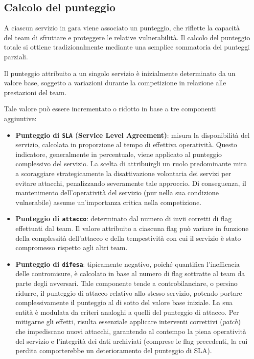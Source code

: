 \subsection{Calcolo del punteggio}

A ciascun servizio in gara viene associato un punteggio, che riflette la capacità del team di sfruttare e proteggere le relative vulnerabilità. Il calcolo del punteggio totale si ottiene tradizionalmente mediante una semplice sommatoria dei punteggi parziali.

Il punteggio attribuito a un singolo servizio è inizialmente determinato da un valore base, soggetto a variazioni durante la competizione in relazione alle prestazioni del team.

Tale valore può essere incrementato o ridotto in base a tre componenti aggiuntive:

\begin{itemize}
    \setlength{\itemsep}{2pt}
    \setlength{\parskip}{2pt}
    \item \textbf{Punteggio di \texttt{SLA} (Service Level Agreement)}: misura la disponibilità del servizio, calcolata in proporzione al tempo di effettiva operatività.
    Questo indicatore, generalmente in percentuale, viene applicato al punteggio complessivo del servizio.
    La scelta di attribuirgli un ruolo predominante mira a scoraggiare strategicamente la disattivazione volontaria dei servizi per evitare attacchi, penalizzando severamente tale approccio.
    Di conseguenza, il mantenimento dell’operatività del servizio (pur nella sua condizione vulnerabile) assume un’importanza critica nella competizione.
    \item \textbf{Punteggio di \texttt{attacco}}: determinato dal numero di invii corretti di flag effettuati dal team.
    Il valore attribuito a ciascuna flag può variare in funzione della complessità dell’attacco e della tempestività con cui il servizio è stato compromesso rispetto
    agli altri team.
    \item \textbf{Punteggio di \texttt{difesa}}: tipicamente negativo, poiché quantifica l’inefficacia delle contromisure, è calcolato in base al numero di flag sottratte al
    team da parte degli avversari. Tale componente tende a controbilanciare, o persino ridurre, il punteggio di attacco relativo allo stesso servizio,
    potendo portare complessivamente il punteggio al di sotto del valore base iniziale. La sua entità è modulata da criteri analoghi a quelli del punteggio di attacco.
    Per mitigarne gli effetti, risulta essenziale applicare interventi correttivi (\emph{patch}) che impediscano nuovi attacchi,
    garantendo al contempo la piena operatività del servizio e l’integrità dei dati archiviati (comprese le flag precedenti, la cui perdita comporterebbe un deterioramento del punteggio di SLA).
\end{itemize}

